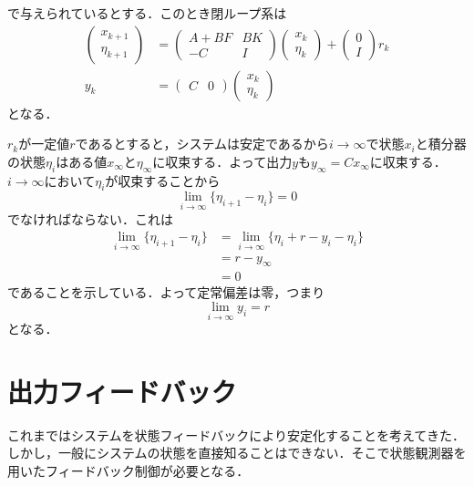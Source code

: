 で与えられているとする．このとき閉ループ系は
\begin{align}
 \left(\begin{array}{c}
	x_{k+1} \\
	\eta_{k+1}
       \end{array}\right)
 &=
 \left(\begin{array}{cc}
        A + B F & B K  \\
	-C      & I
       \end{array}\right)
 \left(\begin{array}{c}
        x_k \\
	\eta_k
       \end{array}\right)
 +
 \left(\begin{array}{c}
        0 \\
	I
       \end{array}\right) 
 r_k \\
 y_k &=
  \left(\begin{array}{cc}
         C & 0 
	\end{array}\right)
  \left(\begin{array}{c}
         x_k \\
	 \eta_k
	\end{array}\right)
\end{align}
となる．

$r_k$が一定値$r$であるとすると，システムは安定であるから$i
\rightarrow \infty $で状態$x_i$と積分器の状態$\eta_i$はある値$x_{\infty}
$と$\eta_{\infty}$に収束する．よって出力$y$も$y_{\infty} = C x_{\infty}
$に収束する．$i \rightarrow \infty$において$\eta_i$が収束することから
\begin{equation}
 \lim_{i \rightarrow \infty} \{\eta_{i+1}-\eta_{i}\} = 0
\end{equation}
でなければならない．これは
\begin{align}
 \lim_{i \rightarrow \infty} \{ \eta_{i+1} - \eta_i \}
  &= \lim_{i \rightarrow \infty}
  \{ \eta_i + r - y_i - \eta_i \}\nonumber \\
 &= r - y_{\infty}\nonumber \\
 &= 0
\end{align}
であることを示している．よって定常偏差は零，つまり
\begin{equation}
 \lim_{i \rightarrow \infty} y_i = r
\end{equation}
となる．
\section{出力フィードバック}
これまではシステムを状態フィードバックにより安定化することを考えてきた．
しかし，一般にシステムの状態を直接知ることはできない．そこで状態観測器を
用いたフィードバック制御が必要となる．

